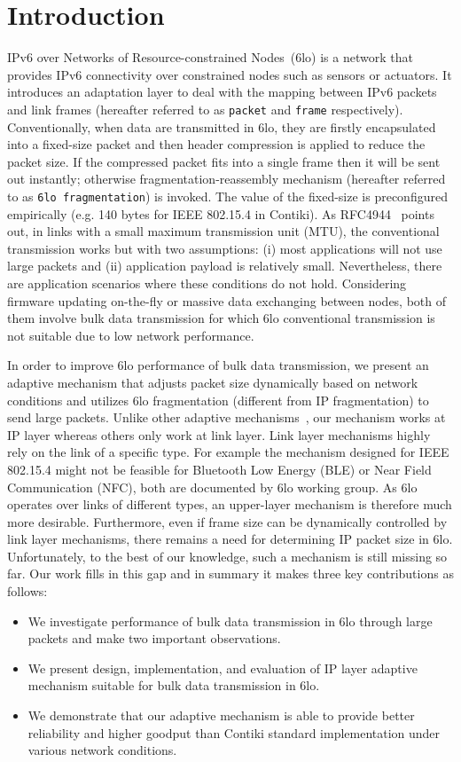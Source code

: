 \documentclass[runningheads,a4paper]{llncs}
\begin{document}
\section{Introduction}
IPv6 over Networks of Resource-constrained Nodes~(6lo) is a network that provides IPv6 connectivity over constrained nodes such as sensors or actuators. It introduces an adaptation layer to deal with the mapping between IPv6 packets and link frames (hereafter referred to as \texttt{packet} and \texttt{frame} respectively). Conventionally, when data are transmitted in 6lo, they are firstly encapsulated into a fixed-size packet and then header compression is applied to reduce the packet size. If the compressed packet fits into a single frame then it will be sent out instantly; otherwise fragmentation-reassembly mechanism (hereafter referred to as \texttt{6lo fragmentation}) is invoked. The value of the fixed-size is preconfigured empirically (e.g. 140 bytes for IEEE 802.15.4 in Contiki). As RFC4944~\cite{Rfc4944} points out, in links with a small maximum transmission unit (MTU), the conventional transmission works but with two assumptions: (i) most applications will not use large packets and (ii) application payload is relatively small. Nevertheless, there are application scenarios where these conditions do not hold. Considering firmware updating on-the-fly or massive data exchanging between nodes, both of them involve bulk data transmission for which 6lo conventional transmission is not suitable due to low network performance.

In order to improve 6lo performance of bulk data transmission, we present an adaptive mechanism that adjusts packet size dynamically based on network conditions and utilizes 6lo fragmentation (different from IP fragmentation) to send large packets. Unlike other adaptive mechanisms~\cite{Dong2010, Jele2008, Ou2009}, our mechanism works at IP layer whereas others only work at link layer. Link layer mechanisms highly rely on the link of a specific type. For example the mechanism designed for IEEE 802.15.4 might not be feasible for Bluetooth Low Energy (BLE) or Near Field Communication (NFC), both are documented by 6lo working group. As 6lo operates over links of different types, an upper-layer mechanism is therefore much more desirable. Furthermore, even if frame size can be dynamically controlled by link layer mechanisms, there remains a need for determining IP packet size in 6lo. Unfortunately, to the best of our knowledge, such a mechanism is still missing so far. Our work fills in this gap and in summary it makes three key contributions as follows:
\begin{itemize}
\item We investigate performance of bulk data transmission in 6lo through large packets and make two important observations.
\item We present design, implementation, and evaluation of IP layer adaptive mechanism suitable for bulk data transmission in 6lo.
\item We demonstrate that our adaptive mechanism is able to provide better reliability and higher goodput than Contiki standard implementation under various network conditions.
\end{itemize}
\end{document}
